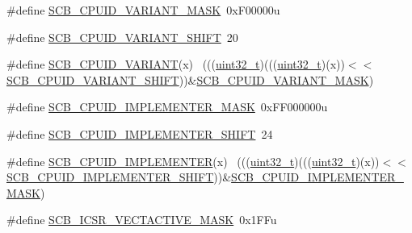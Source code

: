 \begin{DoxyCompactItemize}
\item 
\#define \hyperlink{group___s_c_b___register___masks_ga42f96b8e820835b499d29a04e593d363}{S\+C\+B\+\_\+\+C\+P\+U\+I\+D\+\_\+\+V\+A\+R\+I\+A\+N\+T\+\_\+\+M\+A\+SK}~0x\+F00000u
\item 
\#define \hyperlink{group___s_c_b___register___masks_ga810d19688c9813a71a60087f8ad98b2f}{S\+C\+B\+\_\+\+C\+P\+U\+I\+D\+\_\+\+V\+A\+R\+I\+A\+N\+T\+\_\+\+S\+H\+I\+FT}~20
\item 
\#define \hyperlink{group___s_c_b___register___masks_ga5893cc47868f7ce5410fc210cb28e56f}{S\+C\+B\+\_\+\+C\+P\+U\+I\+D\+\_\+\+V\+A\+R\+I\+A\+NT}(x)                                      ~(((\hyperlink{_p_e___types_8h_a33594304e786b158f3fb30289278f5af}{uint32\+\_\+t})(((\hyperlink{_p_e___types_8h_a33594304e786b158f3fb30289278f5af}{uint32\+\_\+t})(x))$<$$<$\hyperlink{group___s_c_b___register___masks_ga810d19688c9813a71a60087f8ad98b2f}{S\+C\+B\+\_\+\+C\+P\+U\+I\+D\+\_\+\+V\+A\+R\+I\+A\+N\+T\+\_\+\+S\+H\+I\+FT}))\&\hyperlink{group___s_c_b___register___masks_ga42f96b8e820835b499d29a04e593d363}{S\+C\+B\+\_\+\+C\+P\+U\+I\+D\+\_\+\+V\+A\+R\+I\+A\+N\+T\+\_\+\+M\+A\+SK})
\item 
\#define \hyperlink{group___s_c_b___register___masks_gab1f83660e1dfa68aeccfed5a890725a9}{S\+C\+B\+\_\+\+C\+P\+U\+I\+D\+\_\+\+I\+M\+P\+L\+E\+M\+E\+N\+T\+E\+R\+\_\+\+M\+A\+SK}~0x\+F\+F000000u
\item 
\#define \hyperlink{group___s_c_b___register___masks_ga6729af9d9ed3840dae99f10bb2feb44d}{S\+C\+B\+\_\+\+C\+P\+U\+I\+D\+\_\+\+I\+M\+P\+L\+E\+M\+E\+N\+T\+E\+R\+\_\+\+S\+H\+I\+FT}~24
\item 
\#define \hyperlink{group___s_c_b___register___masks_gab0fb7e28b04f21790b271cc997368c35}{S\+C\+B\+\_\+\+C\+P\+U\+I\+D\+\_\+\+I\+M\+P\+L\+E\+M\+E\+N\+T\+ER}(x)                              ~(((\hyperlink{_p_e___types_8h_a33594304e786b158f3fb30289278f5af}{uint32\+\_\+t})(((\hyperlink{_p_e___types_8h_a33594304e786b158f3fb30289278f5af}{uint32\+\_\+t})(x))$<$$<$\hyperlink{group___s_c_b___register___masks_ga6729af9d9ed3840dae99f10bb2feb44d}{S\+C\+B\+\_\+\+C\+P\+U\+I\+D\+\_\+\+I\+M\+P\+L\+E\+M\+E\+N\+T\+E\+R\+\_\+\+S\+H\+I\+FT}))\&\hyperlink{group___s_c_b___register___masks_gab1f83660e1dfa68aeccfed5a890725a9}{S\+C\+B\+\_\+\+C\+P\+U\+I\+D\+\_\+\+I\+M\+P\+L\+E\+M\+E\+N\+T\+E\+R\+\_\+\+M\+A\+SK})
\item 
\#define \hyperlink{group___s_c_b___register___masks_ga5818ac6e0642a5053dd525d82623054b}{S\+C\+B\+\_\+\+I\+C\+S\+R\+\_\+\+V\+E\+C\+T\+A\+C\+T\+I\+V\+E\+\_\+\+M\+A\+SK}~0x1\+F\+Fu
\item 

\end{DoxyCompactItemize}

